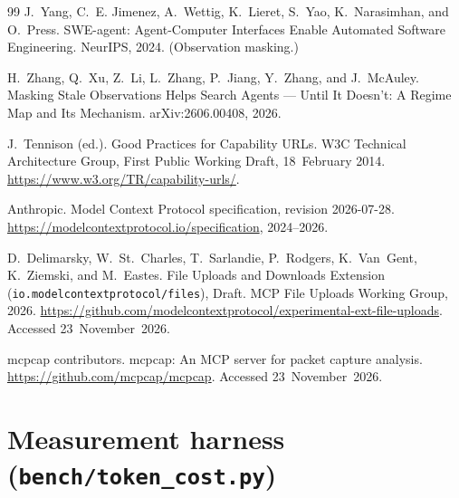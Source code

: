 \documentclass[11pt]{article}
\begin{document}
\begin{thebibliography}{99}
J.~Yang, C.~E. Jimenez, A.~Wettig, K.~Lieret, S.~Yao, K.~Narasimhan, and O.~Press.
\newblock SWE-agent: Agent-Computer Interfaces Enable Automated Software Engineering.
\newblock NeurIPS, 2024. (Observation masking.)

H.~Zhang, Q.~Xu, Z.~Li, L.~Zhang, P.~Jiang, Y.~Zhang, and J.~McAuley.
\newblock Masking Stale Observations Helps Search Agents --- Until It Doesn't: A Regime Map and Its Mechanism.
\newblock arXiv:2606.00408, 2026.

J.~Tennison (ed.).
\newblock Good Practices for Capability URLs.
\newblock W3C Technical Architecture Group, First Public Working Draft, 18~February 2014. \url{https://www.w3.org/TR/capability-urls/}.

Anthropic.
\newblock Model Context Protocol specification, revision 2026-07-28.
\newblock \url{https://modelcontextprotocol.io/specification}, 2024--2026.

D.~Delimarsky, W.~St.~Charles, T.~Sarlandie, P.~Rodgers, K.~Van~Gent, K.~Ziemski, and M.~Eastes.
\newblock File Uploads and Downloads Extension (\texttt{io.modelcontextprotocol/files}), Draft.
\newblock MCP File Uploads Working Group, 2026. \url{https://github.com/modelcontextprotocol/experimental-ext-file-uploads}. Accessed 23~November~2026.

mcpcap contributors.
\newblock mcpcap: An MCP server for packet capture analysis.
\newblock \url{https://github.com/mcpcap/mcpcap}. Accessed 23~November~2026.

\end{thebibliography}

\appendix

\section{Measurement harness (\texttt{bench/token\_cost.py})}\label{app:harness}
\end{document}
